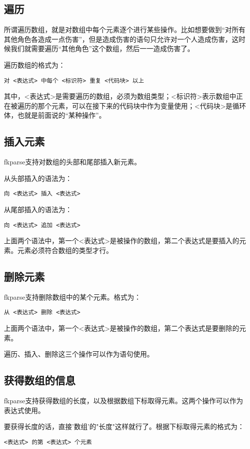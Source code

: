 \subsection{遍历}

所谓遍历数组，就是对数组中每个元素逐个进行某些操作。比如想要做到“对所有其他角色各造成一点伤害”，但是造成伤害的语句只允许对一个人造成伤害，这时候我们就需要遍历“其他角色”这个数组，然后一一造成伤害了。

遍历数组的格式为：

\begin{verbatim}
对 <表达式> 中每个 <标识符> 重复 <代码块> 以上
\end{verbatim}

其中，<表达式>是需要遍历的数组，必须为数组类型；<标识符>表示数组中正在被遍历的那个元素，可以在接下来的代码块中作为变量使用；<代码块>是循环体，也就是前面说的“某种操作”。

\subsection{插入元素}

fkparse支持对数组的头部和尾部插入新元素。

从头部插入的语法为：

\begin{verbatim}
向 <表达式> 插入 <表达式>
\end{verbatim}

从尾部插入的语法为：

\begin{verbatim}
向 <表达式> 追加 <表达式>
\end{verbatim}

上面两个语法中，第一个<表达式>是被操作的数组，第二个表达式是要插入的元素。元素必须符合数组的类型才行。

\subsection{删除元素}

fkparse支持删除数组中的某个元素。格式为：

\begin{verbatim}
从 <表达式> 删除 <表达式>
\end{verbatim}

上面两个语法中，第一个<表达式>是被操作的数组，第二个表达式是要删除的元素。

遍历、插入、删除这三个操作可以作为语句使用。

\subsection{获得数组的信息}

fkparse支持获得数组的长度，以及根据数组下标取得元素。这两个操作可以作为表达式使用。

要获得长度的话，直接'数组'的"长度"这样就行了。根据下标取得元素的格式为：

\begin{verbatim}
<表达式> 的第 <表达式> 个元素
\end{verbatim}
